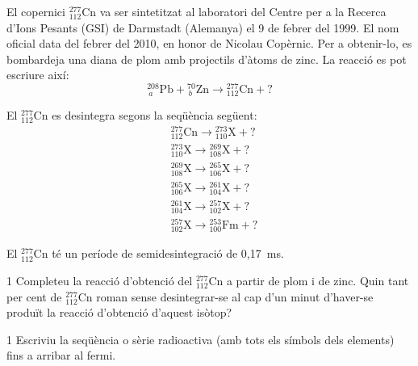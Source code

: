 El copernici $^{277}_{112}\mathrm{Cn}$ va ser sintetitzat al laboratori del Centre per a la Recerca d'Ions Pesants (GSI) de Darmstadt (Alemanya) el 9 de febrer del 1999. El nom oficial data del febrer del 2010, en honor de Nicolau Copèrnic. Per a obtenir-lo, es bombardeja una diana de plom amb projectils d'àtoms de zinc. La reacció es pot escriure així:
\[ {}^{208}_{\ a}\mathrm{Pb} + {}^{70}_{\,b}\mathrm{Zn} \rightarrow {}^{277}_{112}\mathrm{Cn} + {?} \]


El $^{277}_{112}\mathrm{Cn}$ es desintegra segons la seqüència següent:
\begin{align*}
&{}^{277}_{112}\mathrm{Cn} \rightarrow {}^{273}_{110}\mathrm{X} + {?}\\
&{}^{273}_{110}\mathrm{X} \rightarrow {}^{269}_{108}\mathrm{X} + {?}\\
&{}^{269}_{108}\mathrm{X} \rightarrow {}^{265}_{106}\mathrm{X} + {?}\\
&{}^{265}_{106}\mathrm{X} \rightarrow {}^{261}_{104}\mathrm{X} + {?}\\
&{}^{261}_{104}\mathrm{X} \rightarrow {}^{257}_{102}\mathrm{X} + {?}\\
&{}^{257}_{102}\mathrm{X} \rightarrow {}^{253}_{100}\mathrm{Fm} + {?}
\end{align*}

El $^{277}_{112}\mathrm{Cn}$ té un període de semidesintegració de 0,17~ms.

\begin{apartat}{1}
Completeu la reacció d'obtenció del $^{277}_{112}\mathrm{Cn}$ a partir de plom i de zinc. Quin tant per cent de $^{277}_{112}\mathrm{Cn}$ roman sense desintegrar-se al cap d'un minut d'haver-se produït la reacció d'obtenció d'aquest isòtop?
\end{apartat}

\begin{apartat}{1}
Escriviu la seqüència o sèrie radioactiva (amb tots els símbols dels elements) fins a arribar al fermi.
\end{apartat}

